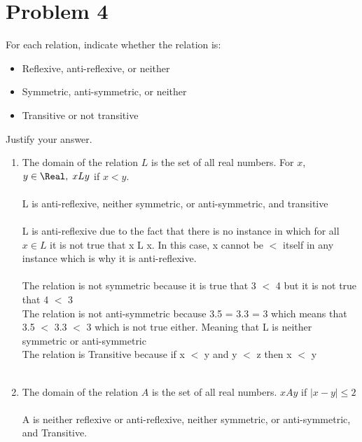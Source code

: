 \section*{Problem 4}

For each relation, indicate whether the relation is:
\begin{itemize}
  \item Reflexive, anti-reflexive, or neither
  \item Symmetric, anti-symmetric, or neither
  \item Transitive or not transitive
\end{itemize}
Justify your answer.\\
\begin{enumerate}[label=(\alph*)]
\item The domain of the relation $L$ is the set of all real numbers. For $x$, $y \in \Real, \; xLy$ if $x < y$.\\\\
L is anti-reflexive, neither symmetric, or anti-symmetric, and transitive \\
\\
L is anti-reflexive due to the fact that there is no instance in which for all $x \in L$
it is not true that x L x. In this case, x cannot be $<$ itself in any instance which is why it is anti-reflexive.
\\
\\
The relation is not symmetric because it is true that 3 $<$ 4 but it is not true that 4 $<$ 3
\\

The relation is not anti-symmetric because 3.5 = 3.3 = 3 which means that 3.5 $<$ 3.3 $<$ 3 which is not true either. Meaning that L is neither symmetric or anti-symmetric
\\

The relation is Transitive because if x $<$ y and y $<$ z  then x $<$ y
\\\\

\item The domain of the relation $A$ is the set of all real numbers. $xAy$ if $|x-y| \leq 2$\\\\
A is neither reflexive or anti-reflexive, neither symmetric, or anti-symmetric, and Transitive. \\


\end{enumerate}
